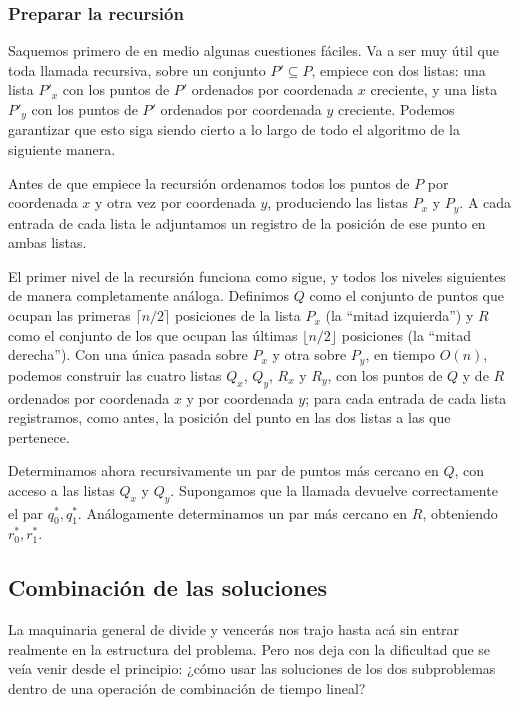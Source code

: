 \documentclass[12pt, spanish, oneside, openany]{book}
\theoremstyle{uprightplain}
\theoremstyle{definition}
\theoremstyle{remark}
\theoremstyle{definition}
\begin{document}
\subsubsection{Preparar la recursión}

Saquemos primero de en medio algunas cuestiones fáciles. Va a ser muy útil que toda llamada recursiva, sobre un conjunto $P'\subseteq P$, empiece con dos listas: una lista $P'_x$ con los puntos de $P'$ ordenados por coordenada $x$ creciente, y una lista $P'_y$ con los puntos de $P'$ ordenados por coordenada $y$ creciente. Podemos garantizar que esto siga siendo cierto a lo largo de todo el algoritmo de la siguiente manera.

Antes de que empiece la recursión ordenamos todos los puntos de $P$ por coordenada $x$ y otra vez por coordenada $y$, produciendo las listas $P_x$ y $P_y$. A cada entrada de cada lista le adjuntamos un registro de la posición de ese punto en ambas listas.

El primer nivel de la recursión funciona como sigue, y todos los niveles siguientes de manera completamente análoga. Definimos $Q$ como el conjunto de puntos que ocupan las primeras $\lceil n/2\rceil$ posiciones de la lista $P_x$ (la ``mitad izquierda'') y $R$ como el conjunto de los que ocupan las últimas $\lfloor n/2\rfloor$ posiciones (la ``mitad derecha''). Con una única pasada sobre $P_x$ y otra sobre $P_y$, en tiempo $O(n)$, podemos construir las cuatro listas $Q_x$, $Q_y$, $R_x$ y $R_y$, con los puntos de $Q$ y de $R$ ordenados por coordenada $x$ y por coordenada $y$; para cada entrada de cada lista registramos, como antes, la posición del punto en las dos listas a las que pertenece.

Determinamos ahora recursivamente un par de puntos más cercano en $Q$, con acceso a las listas $Q_x$ y $Q_y$. Supongamos que la llamada devuelve correctamente el par $q_0^*, q_1^*$. Análogamente determinamos un par más cercano en $R$, obteniendo $r_0^*, r_1^*$.

\subsection{Combinación de las soluciones}

La maquinaria general de divide y vencerás nos trajo hasta acá sin entrar realmente en la estructura del problema. Pero nos deja con la dificultad que se veía venir desde el principio: ¿cómo usar las soluciones de los dos subproblemas dentro de una operación de combinación de tiempo lineal?
\end{document}
